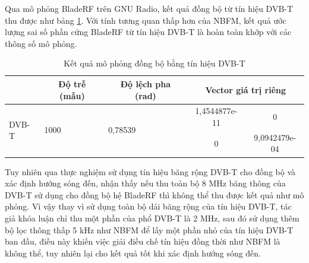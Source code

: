 Qua mô phỏng BladeRF trên GNU Radio, kết quả đồng bộ từ tín hiệu DVB-T thu được như bảng \ref{tab:kqdvbt}. Với tính tương quan thấp hơn của NBFM, kết quả ước lượng sai số phần cứng BladeRF từ tín hiệu DVB-T là hoàn toàn khớp với các thông số mô phỏng.
\begin{table}[!h]
	\caption{Kết quả mô phỏng đồng bộ bằng tín hiệu DVB-T}
	\centering
	\begin{tabular}{|l|l|l|cc|} 
		\hline
		\rowcolor[rgb]{1,0.91,0.906} \multicolumn{1}{|c|}{ \textbf{Loại tín hiệu} } & \multicolumn{1}{c|}{\textbf{Độ trễ (mẫu)} } & \multicolumn{1}{c|}{\textbf{Độ lệch pha (rad)} } & \multicolumn{2}{c|}{\textbf{Vector giá trị riêng} }  \\ 
		\hline
		\multirow{2}{*}{DVB-T}                                                      & \multirow{2}{*}{1000}                       & \multirow{2}{*}{0,78539}                         & 1,4544877e-11 & 0                                    \\
		&                                             &                                                  & 0             & 9,0942479e-04                        \\
		\hline
	\end{tabular}
\label{tab:kqdvbt}
\end{table}

Tuy nhiên qua thực nghiệm sử dụng tín hiệu băng rộng DVB-T cho đồng bộ và xác định hướng sóng đến, nhận thấy nếu thu toàn bộ 8 MHz băng thông của DVB-T sử dụng cho đồng bộ hệ BladeRF thì không thể thu được kết quả như mô phỏng. Vì vậy thay vì sử dụng toàn bộ dải băng rộng của tín hiệu DVB-T, tác giả khóa luận chỉ thu một phần của phổ DVB-T là 2 MHz, sau đó sử dụng thêm bộ lọc thông thấp 5 kHz như NBFM để lấy một phần nhỏ của tín hiệu DVB-T ban đầu, điều này khiến việc giải điều chế tín hiệu đồng thời như NBFM là không thể, tuy nhiên lại cho kết quả tốt khi xác định hướng sóng đến.

